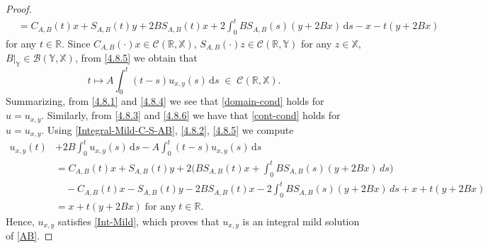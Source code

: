 \documentclass[11pt]{amsart}
\numberwithin{equation}{section}
\newcommand{\SAB}{S_{A,B}}
\newcommand{\CAB}{C_{A,B}}
\newcommand{\rmd}{{\mathrm{d}}}
\theoremstyle{remark}
\theoremstyle{definition}
\newcommand\bX{{\mathbb X}}
\newcommand\bY{{\mathbb Y}}
\begin{document}
\begin{proof}
\begin{align}
		&=\CAB(t)x+\SAB(t)y+2B\SAB(t)x+2\int_0^t B\SAB(s)(y+2Bx)\,\rmd s-x-t(y+2Bx)
	\end{align}
	for any $t \in \mathbb{R}$. Since $\CAB(\cdot)x \in \mathcal{C}(\mathbb{R},\bX)$, $\SAB(\cdot)z \in \mathcal{C}(\mathbb{R},\bY)$ for any $z \in \bX$, $B|_\bY \in \mathcal{B}(\bY,\bX)$, from \eqref{4.8.5} we obtain that
	\begin{equation}\label{4.8.6}
		t \mapsto A\int_0^t (t-s)u_{x,y}(s)\,\rmd s \;\in\; \mathcal{C}(\mathbb{R}, \bX).
	\end{equation}
	Summarizing, from \eqref{4.8.1} and \eqref{4.8.4} we see that \eqref{domain-cond} holds for $u = u_{x,y}$. Similarly, from \eqref{4.8.3} and \eqref{4.8.6} we have that \eqref{cont-cond} holds for $u = u_{x,y}$.
	Using \eqref{Integral-Mild-C-S-AB}, \eqref{4.8.2}, \eqref{4.8.5} we compute
	\begin{align}\label{4.8.7}
		u_{x,y}(t)&+ 2B\int_0^t u_{x,y}(s)\,\rmd s - A\int_0^t (t-s)u_{x,y}(s)\,\rmd s\nonumber\\
		&= \CAB(t)x + \SAB(t)y
		+ 2\Big(B\SAB(t)x + \int_0^t B\SAB(s)(y+2Bx)\,ds\Big)\nonumber\\
		&\quad - \CAB(t)x - \SAB(t)y
		- 2BS_{A,B}(t)x
		- 2\int_0^t B\SAB(s)(y+2Bx)\,ds + x + t(y+2Bx)\nonumber\\
		&= x + t(y + 2Bx) \; \text{for any}\; t \in \mathbb{R}.
	\end{align}
	Hence, $u_{x,y}$ satisfies \eqref{Int-Mild}, which proves that $u_{x,y}$ is an integral mild solution of \eqref{AB}.
	

\end{proof}
\end{document}
